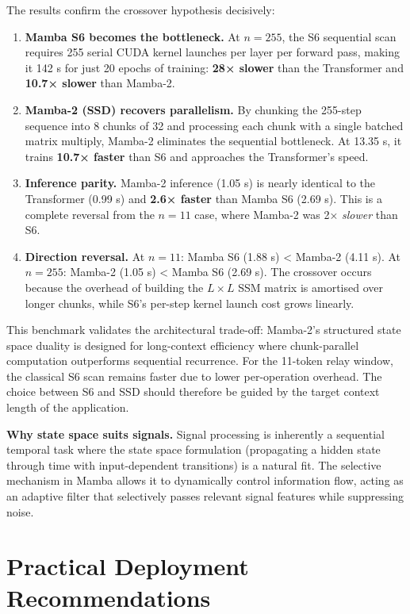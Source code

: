 The results confirm the crossover hypothesis decisively:

\begin{enumerate}
\def\labelenumi{\arabic{enumi}.}
\item
  \textbf{Mamba S6 becomes the bottleneck.} At \(n = 255\), the S6 sequential scan requires 255 serial CUDA kernel launches per layer per forward pass, making it 142 s for just 20 epochs of training: \textbf{28× slower} than the Transformer and \textbf{10.7× slower} than Mamba-2.
\item
  \textbf{Mamba-2 (SSD) recovers parallelism.} By chunking the 255-step sequence into 8 chunks of 32 and processing each chunk with a single batched matrix multiply, Mamba-2 eliminates the sequential bottleneck. At 13.35 s, it trains \textbf{10.7× faster} than S6 and approaches the Transformer's speed.
\item
  \textbf{Inference parity.} Mamba-2 inference (1.05 s) is nearly identical to the Transformer (0.99 s) and \textbf{2.6× faster} than Mamba S6 (2.69 s). This is a complete reversal from the \(n = 11\) case, where Mamba-2 was 2× \emph{slower} than S6.
\item
  \textbf{Direction reversal.} At \(n = 11\): Mamba S6 (1.88 s) \textless{} Mamba-2 (4.11 s). At \(n = 255\): Mamba-2 (1.05 s) \textless{} Mamba S6 (2.69 s). The crossover occurs because the overhead of building the \(L \times L\) SSM matrix is amortised over longer chunks, while S6's per-step kernel launch cost grows linearly.
\end{enumerate}

This benchmark validates the architectural trade-off: Mamba-2's structured state space duality is designed for long-context efficiency where chunk-parallel computation outperforms sequential recurrence. For the 11-token relay window, the classical S6 scan remains faster due to lower per-operation overhead. The choice between S6 and SSD should therefore be guided by the target context length of the application.

\textbf{Why state space suits signals.} Signal processing is inherently a sequential temporal task where the state space formulation (propagating a hidden state through time with input-dependent transitions) is a natural fit. The selective mechanism in Mamba allows it to dynamically control information flow, acting as an adaptive filter that selectively passes relevant signal features while suppressing noise.

\section{Practical Deployment Recommendations}\label{sec:practical-deployment-recommendations}

